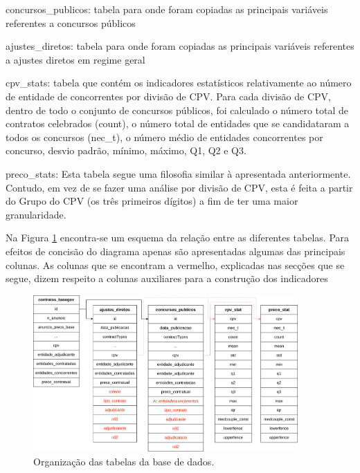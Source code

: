 \begin{my_itemize}
	\item concursos\_publicos: tabela para onde foram copiadas as principais variáveis referentes a concursos públicos
	
	\item ajustes\_diretos: tabela para onde foram copiadas as principais variáveis referentes a ajustes diretos em regime geral
	
	\item cpv\_stats: tabela que contém os indicadores estatísticos relativamente ao número de entidade de concorrentes por divisão de CPV. Para cada divisão de CPV, dentro de todo o conjunto de concursos públicos, foi calculado o número total de contratos celebrados (count), o número total de entidades que se candidataram a todos os concursos (nec\_t), o número médio de entidades concorrentes por concurso, desvio padrão, mínimo, máximo, Q1, Q2 e Q3. 
	
	\item preco\_stats: Esta tabela segue uma filosofia similar à apresentada anteriormente. Contudo, em vez de se fazer uma análise por divisão de CPV, esta é feita a partir do Grupo do CPV (os três primeiros dígitos) a fim de ter uma maior granularidade. 
\end{my_itemize}


Na Figura \ref{fig:basededados} encontra-se um esquema da relação entre as diferentes tabelas. Para efeitos de concisão do diagrama apenas são apresentadas algumas das principais colunas. As colunas que se encontram a vermelho, explicadas nas secções que se segue, dizem respeito a colunas auxiliares para a construção dos indicadores

\begin{figure}[H]
	\centering
	\includegraphics[width=0.9\textwidth]{imagens/basedadostabelas.png}
	\caption{Organização das tabelas da base de dados.}
	\label{fig:basededados}
\end{figure}





